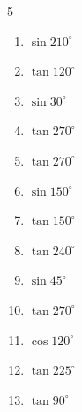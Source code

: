 \begin{multicols}{5}
\begin{enumerate}
  \item $\displaystyle \sin{210^\circ}$


  \item $\displaystyle \tan{120^\circ}$


  \item $\displaystyle \sin{30^\circ}$


  \item $\displaystyle \tan{270^\circ}$

        \phantom{$\displaystyle なし$}

  \item $\displaystyle \tan{270^\circ}$

        \phantom{$\displaystyle なし$}

  \item $\displaystyle \sin{150^\circ}$


  \item $\displaystyle \tan{150^\circ}$


  \item $\displaystyle \tan{240^\circ}$


  \item $\displaystyle \sin{45^\circ}$


  \item $\displaystyle \tan{270^\circ}$

        \phantom{$\displaystyle なし$}

\columnbreak %

  \item $\displaystyle \cos{120^\circ}$


  \item $\displaystyle \tan{225^\circ}$

        \phantom{$\displaystyle =1$}

  \item $\displaystyle \tan{90^\circ}$


\end{enumerate}
\end{multicols}
